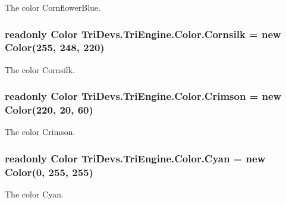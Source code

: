 The color Cornflower\-Blue. 

\hypertarget{struct_tri_devs_1_1_tri_engine_1_1_color_a05731599f062bccc602befb6a15ee386}{
\subsubsection[{Cornsilk}]{\setlength{\rightskip}{0pt plus 5cm}readonly {\bf Color} Tri\-Devs.\-Tri\-Engine.\-Color.\-Cornsilk = new {\bf Color}(255, 248, 220)\hspace{0.3cm}{\ttfamily [static]}}}\label{struct_tri_devs_1_1_tri_engine_1_1_color_a05731599f062bccc602befb6a15ee386}


The color Cornsilk. 

\hypertarget{struct_tri_devs_1_1_tri_engine_1_1_color_a205300443e24e68b31568725be77d5e0}{
\subsubsection[{Crimson}]{\setlength{\rightskip}{0pt plus 5cm}readonly {\bf Color} Tri\-Devs.\-Tri\-Engine.\-Color.\-Crimson = new {\bf Color}(220, 20, 60)\hspace{0.3cm}{\ttfamily [static]}}}\label{struct_tri_devs_1_1_tri_engine_1_1_color_a205300443e24e68b31568725be77d5e0}


The color Crimson. 

\hypertarget{struct_tri_devs_1_1_tri_engine_1_1_color_a3b08cc47230c10ec9f8fedd58f7d6d73}{
\subsubsection[{Cyan}]{\setlength{\rightskip}{0pt plus 5cm}readonly {\bf Color} Tri\-Devs.\-Tri\-Engine.\-Color.\-Cyan = new {\bf Color}(0, 255, 255)\hspace{0.3cm}{\ttfamily [static]}}}\label{struct_tri_devs_1_1_tri_engine_1_1_color_a3b08cc47230c10ec9f8fedd58f7d6d73}


The color Cyan. 


